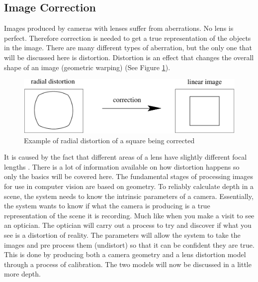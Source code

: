 \documentclass[11pt,oneside]{report}
\begin{document}
				\subsection{Image Correction}
				Images produced by cameras with lenses suffer from aberrations.
				No lens is perfect.
				Therefore correction is needed to get a true representation of the objects in the image.
				There are many different types of aberration, but the only one that will be discussed here is distortion.
				Distortion is an effect that changes the overall shape of an image (geometric warping) (See Figure \ref{fig:distortion}).
				\begin{figure}[!h]
				\begin{center}
					
    					\includegraphics[scale=0.5]{distortion_1}
    					\caption{Example of radial distortion of a square being corrected \protect\cite{book:multiViewGeo} {\label{fig:distortion}}}
    				\end{center}
				\end{figure}				
				It is caused by the fact that different areas of a lens have slightly different focal lengths \cite[p. 42]{book:modern}.
				There is a lot of information available on how distortion happens so only the basics will be covered here. %
				The fundamental stages of processing images for use in computer vision are based on geometry.
				To reliably calculate depth in a scene, the system needs to know the intrinsic %
				parameters of a camera.
				Essentially, the system wants to know if what the camera is producing is a true representation of the scene it is recording.
				Much like when you make a visit to see an optician. 
				The optician will carry out a process to try and discover if what you see is a distortion of reality.
				The parameters will allow the system to take the images and pre process them (undistort) so that it can be confident they are true.
				This is done by producing both a camera geometry and a lens distortion model through a process of calibration.  
				The two models will now be discussed in a little more depth.				
\end{document}
